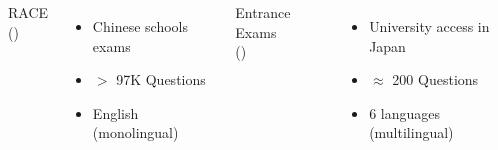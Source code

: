 \mAlertSpace
\mAlertSpace
\begin{columns}[T, onlytextwidth]
  RACE \\(\cite{Lai2017})
  \mAlertSpace
  \hline
  \mAlertSpace
    \begin{itemize}
      \item Chinese schools exams
      \item $>$ 97K Questions
      \item English (monolingual)
    \end{itemize}
  Entrance Exams \\
  (\cite{rodrigo_systems_2018})
  \mAlertSpace
  \hline
  \mAlertSpace
    \begin{itemize}
      \item University access in Japan
      \item $\approx$ 200 Questions
      \item 6 languages (multilingual)
    \end{itemize}
\end{columns}
